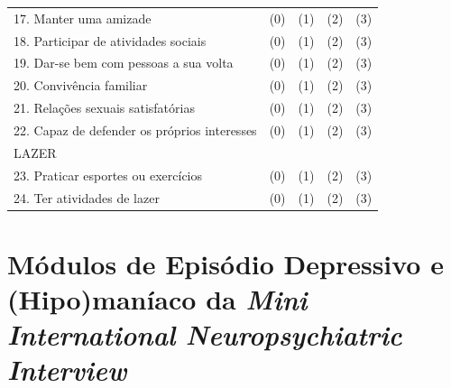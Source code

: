 \documentclass[chapter=TITLE,
               oneside,
               12pt,
               a4paper,
               english,
               brazil]{abntex2}    %
\begin{document}
\begin{anexosenv}
\begin{table}[H]
{\begin{tabular}{@{}p{}llll@{}}
            \midrule
            17. Manter uma amizade & (0) & (1) & (2) & (3) \\
            18. Participar de atividades sociais & (0) & (1) & (2) & (3) \\
            19. Dar-se bem com pessoas a sua volta & (0) & (1) & (2) & (3) \\
            20. Convivência familiar & (0) & (1) & (2) & (3) \\
            21. Relações sexuais satisfatórias & (0) & (1) & (2) & (3) \\
            22. Capaz de defender os próprios interesses & (0) & (1) & (2) & (3) \\
            \midrule
            LAZER & & & & \\
            \midrule
            23. Praticar esportes ou exercícios & (0) & (1) & (2) & (3) \\
            24. Ter atividades de lazer & (0) & (1) & (2) & (3) \\
            \bottomrule
            \end{tabular}%
            }
            \end{table}


    \chapter{Módulos de Episódio Depressivo e (Hipo)maníaco da \textit{Mini
             International Neuropsychiatric Interview}}
        

\end{anexosenv}
\end{document}
